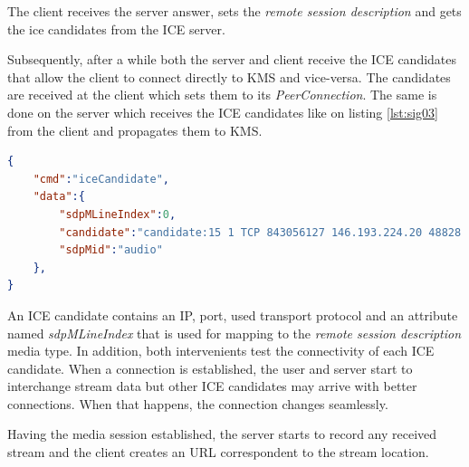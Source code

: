 The client receives the server answer, sets the \emph{remote session description} and gets the ice candidates from the \ac{ICE} server.

Subsequently, after a while both the server and client receive the \ac{ICE} candidates that allow the client to connect directly to \ac{KMS} and vice-versa. The candidates are received at the client which sets them to its \emph{PeerConnection}. The same is done on the server which receives the \ac{ICE} candidates like on listing \ref{lst:sig03} from the client and propagates them to \ac{KMS}.

\begin{minipage}{\linewidth}
\begin{lstlisting}[caption={ICE candidates sent by KMS and client},label={lst:sig03},language=json]
{
	"cmd":"iceCandidate",
	"data":{
		"sdpMLineIndex":0,
		"candidate":"candidate:15 1 TCP 843056127 146.193.224.20 48828 typ srflx raddr 192.168.1.105 rport 48828 tcptype passive",
		"sdpMid":"audio"
	},
}
\end{lstlisting}
\end{minipage}

An \ac{ICE} candidate contains an \ac{IP}, port, used transport protocol and an attribute named \emph{sdpMLineIndex} that is used for mapping to the \emph{remote session description} media type.
In addition, both intervenients test the connectivity of each \ac{ICE} candidate. When a connection is established, the user and server start to interchange stream data but other \ac{ICE} candidates may arrive with better connections. When that happens, the connection changes seamlessly. 

Having the media session established, the server starts to record any received stream and the client creates an \ac{URL} correspondent to the stream location.


